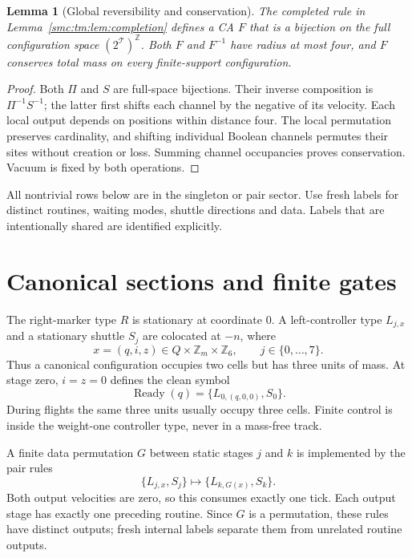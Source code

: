 \documentclass[11pt,letterpaper]{article}
\numberwithin{equation}{section}
\newtheorem{lemma}[theorem]{Lemma}
\theoremstyle{definition}
\theoremstyle{remark}
\newcommand{\Z}{\mathbb Z}
\newcommand{\Ready}{\operatorname{Ready}}
\begin{document}
\begin{lemma}[Global reversibility and conservation]\label{smc:tm:lem:global}
The completed rule in Lemma~\ref{smc:tm:lem:completion} defines a CA $F$ that is a bijection on the full configuration space $(2^{\mathcal T})^{\Z}$. Both $F$ and $F^{-1}$ have radius at most four, and $F$ conserves total mass on every finite-support configuration.
\end{lemma}
\begin{proof}
Both $\Pi$ and $S$ are full-space bijections. Their inverse composition is $\Pi^{-1}S^{-1}$; the latter first shifts each channel by the negative of its velocity. Each local output depends on positions within distance four. The local permutation preserves cardinality, and shifting individual Boolean channels permutes their sites without creation or loss. Summing channel occupancies proves conservation. Vacuum is fixed by both operations.
\end{proof}

All nontrivial rows below are in the singleton or pair sector. Use fresh labels for distinct routines, waiting modes, shuttle directions and data. Labels that are intentionally shared are identified explicitly.

\section{Canonical sections and finite gates}\label{smc:tm:sec:canonical}

The right-marker type $R$ is stationary at coordinate $0$. A left-controller type $L_{j,x}$ and a stationary shuttle $S_j$ are colocated at $-n$, where
\[
x=(q,i,z)\in Q\times\Z_m\times\Z_6,\qquad j\in\{0,\ldots,7\}.
\]
Thus a canonical configuration occupies two cells but has three units of mass. At stage zero, $i=z=0$ defines the clean symbol
\[
\Ready(q)=\{L_{0,(q,0,0)},S_0\}.
\]
During flights the same three units usually occupy three cells. Finite control is inside the weight-one controller type, never in a mass-free track.

A finite data permutation $G$ between static stages $j$ and $k$ is implemented by the pair rules
\begin{equation}\label{smc:tm:eq:gate}
\{L_{j,x},S_j\}\longmapsto\{L_{k,G(x)},S_k\}.
\end{equation}
Both output velocities are zero, so this consumes exactly one tick. Each output stage has exactly one preceding routine. Since $G$ is a permutation, these rules have distinct outputs; fresh internal labels separate them from unrelated routine outputs.
\end{document}
